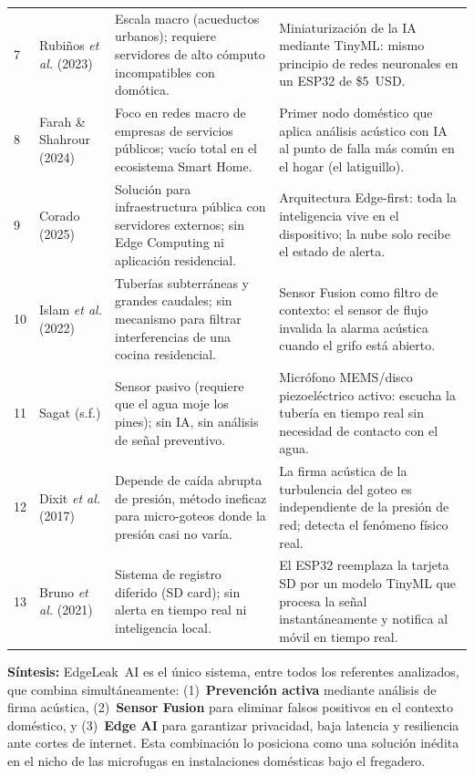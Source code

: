 \documentclass[12pt,a4paper]{article}
\begin{document}
\begin{longtable}{>{\small}p{0.4cm} >{\small}p{3.4cm} >{\small}p{5.0cm} >{\small}p{5.2cm}}
7 & Rubiños \textit{et al.} (2023) & Escala macro (acueductos urbanos); requiere servidores de alto cómputo incompatibles con domótica. & Miniaturización de la IA mediante TinyML: mismo principio de redes neuronales en un ESP32 de \$5~USD. \\[0.4em]
8 & Farah \& Shahrour (2024) & Foco en redes macro de empresas de servicios públicos; vacío total en el ecosistema Smart Home. & Primer nodo doméstico que aplica análisis acústico con IA al punto de falla más común en el hogar (el latiguillo). \\[0.4em]
9 & Corado (2025) & Solución para infraestructura pública con servidores externos; sin Edge Computing ni aplicación residencial. & Arquitectura Edge-first: toda la inteligencia vive en el dispositivo; la nube solo recibe el estado de alerta. \\[0.4em]
10 & Islam \textit{et al.} (2022) & Tuberías subterráneas y grandes caudales; sin mecanismo para filtrar interferencias de una cocina residencial. & Sensor Fusion como filtro de contexto: el sensor de flujo invalida la alarma acústica cuando el grifo está abierto. \\[0.4em]
11 & Sagat (s.f.) & Sensor pasivo (requiere que el agua moje los pines); sin IA, sin análisis de señal preventivo. & Micrófono MEMS/disco piezoeléctrico activo: escucha la tubería en tiempo real sin necesidad de contacto con el agua. \\[0.4em]
12 & Dixit \textit{et al.} (2017) & Depende de caída abrupta de presión, método ineficaz para micro-goteos donde la presión casi no varía. & La firma acústica de la turbulencia del goteo es independiente de la presión de red; detecta el fenómeno físico real. \\[0.4em]
13 & Bruno \textit{et al.} (2021) & Sistema de registro diferido (SD card); sin alerta en tiempo real ni inteligencia local. & El ESP32 reemplaza la tarjeta SD por un modelo TinyML que procesa la señal instantáneamente y notifica al móvil en tiempo real. \\
\end{longtable}

\begin{mdframed}[linecolor=normalgreen,linewidth=1.5pt,backgroundcolor=green!3]
\textbf{Síntesis:} EdgeLeak~AI es el único sistema, entre todos los referentes analizados,
que combina simultáneamente: (1)~\textbf{Prevención activa} mediante análisis de firma
acústica, (2)~\textbf{Sensor Fusion} para eliminar falsos positivos en el contexto
doméstico, y (3)~\textbf{Edge AI} para garantizar privacidad, baja latencia y resiliencia
ante cortes de internet. Esta combinación lo posiciona como una solución inédita en el
nicho de las microfugas en instalaciones domésticas bajo el fregadero.
\end{mdframed}
\end{document}
